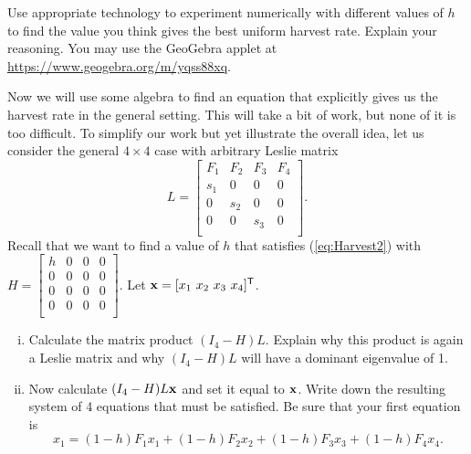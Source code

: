 \begin{pactivity}
\item Use appropriate technology to experiment numerically with different values of $h$ to find the value you think gives the best uniform harvest rate. Explain your reasoning. You may use the GeoGebra applet at \url{https://www.geogebra.org/m/yqss88xq}. 


\item Now we will use some algebra to find an equation that explicitly gives us the harvest rate in the general setting. This will take a bit of work, but none of it is too difficult. To simplify our work but yet illustrate the overall idea, let us consider the general $4 \times 4$ case with arbitrary Leslie matrix
\begin{equation*} 
L = \left[ \begin{array}{cccc}
F_1 & F_2 	& F_3 	& F_4 \\
s_1 & 0 	& 0 	& 0  \\
0 	& s_2 	& 0 	& 0 \\
0 	& 0 	& s_3	& 0  \\
\end{array} \right].
\end{equation*}
Recall that we want to find a value of $h$ that satisfies (\ref{eq:Harvest2}) with $H = \left[ \begin{array}{cccc}
h   & 0 	& 0 	& 0 \\
0   & 0 	& 0 	& 0  \\
0 	& 0 	& 0 	& 0 \\
0 	& 0 	& 0	    & 0  \\
\end{array} \right].$
Let $\mathbf{x} = [x_1 \  x_2 \ x_3 \ x_4]^{\mathsf{T}}$.
        \begin{enumerate}[i.]
        \item Calculate the matrix product $(I_{4}-H)L$. Explain why this product is again a Leslie matrix and why $(I_{4}-H)L$ will have a dominant eigenvalue of 1.


        \item Now calculate $(I_{4}-H)L\mathbf{x}$ and set it equal to $\mathbf{x}$. Write down the resulting system of 4 equations that must be satisfied. Be sure that your first equation is
\begin{equation}
x_1 = (1-h)F_1x_1 + (1-h)F_2x_2 + (1-h)F_3x_3 + (1-h)F_4x_4. \label{eq:harvestval1}
\end{equation}


\end{enumerate}
\end{pactivity}
